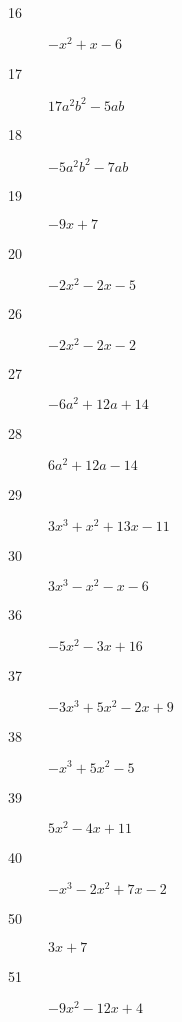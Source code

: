 \documentclass[letterpaper]{exam}
\begin{document}
      \begin{description}






          \item[16] $-x^2 + x - 6$

          \item[17] $17a^2b^2 - 5ab$

          \item[18] $-5a^2b^2 - 7ab$

          \item[19] $-9x + 7$

          \item[20] $-2x^2 -2x - 5$

          \item[26] $-2x^2 - 2x - 2$

          \item[27] $-6a^2 + 12a + 14$

          \item[28] $6a^2 + 12a - 14$

          \item[29] $3x^3 + x^2 + 13x - 11$

          \item[30] $3x^3 - x^2 - x - 6$

          \item[36] $-5x^2 -3x + 16$

          \item[37] $-3x^3 + 5x^2 - 2x + 9$

          \item[38] $-x^3 + 5x^2 - 5$

          \item[39] $5x^2 - 4x + 11$

          \item[40] $-x^3 - 2x^2 + 7x - 2$

          \item[50] $3x + 7$

          \item[51] $-9x^2 -12x + 4$


\end{description}
\end{document}

